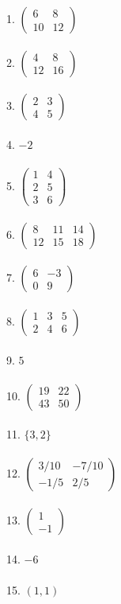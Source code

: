 \documentclass[fleqn]{article}
\begin{document}
1. \(\begin{pmatrix} 6 & 8 \\ 10 & 12 \end{pmatrix}\) \\\\
2. \(\begin{pmatrix} 4 & 8 \\ 12 & 16 \end{pmatrix}\) \\\\
3. \(\begin{pmatrix} 2 & 3 \\ 4 & 5 \end{pmatrix}\) \\\\
4. \(-2\) \\\\
5. \(\begin{pmatrix} 1 & 4 \\ 2 & 5 \\ 3 & 6 \end{pmatrix}\) \\\\
6. \(\begin{pmatrix} 8 & 11 & 14 \\ 12 & 15 & 18 \end{pmatrix}\) \\\\
7. \(\begin{pmatrix} 6 & -3 \\ 0 & 9 \end{pmatrix}\) \\\\
8. \(\begin{pmatrix} 1 & 3 & 5 \\ 2 & 4 & 6 \end{pmatrix}\) \\\\
9. \(5\) \\\\
10. \(\begin{pmatrix} 19 & 22 \\ 43 & 50 \end{pmatrix}\) \\\\
11. \( \{3, 2\} \) \\\\
12. \(\begin{pmatrix} 3/10 & -7/10 \\ -1/5 & 2/5 \end{pmatrix}\) \\\\
13. \( \begin{pmatrix} 1 \\ -1 \end{pmatrix} \) \\\\
14. \( -6 \) \\\\
15. \((1, 1)\) \\\\\      
        
\end{document}
